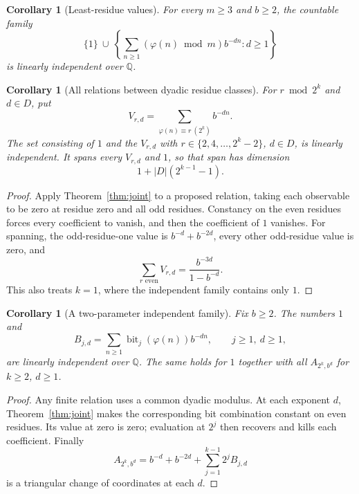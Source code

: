 \documentclass[11pt,a4paper]{article}
\newtheorem{corollary}[theorem]{Corollary}
\theoremstyle{definition}\newtheorem{definition}[theorem]{Definition}
\theoremstyle{remark}\newtheorem{remark}[theorem]{Remark}
\newcommand{\Q}{\mathbb Q}\newcommand{\R}{\mathbb R}\newcommand{\Z}{\mathbb Z}\newcommand{\N}{\mathbb N}
\newcommand{\ph}{\varphi}\newcommand{\rad}{\operatorname{rad}}
\begin{document}
\begin{corollary}[Least-residue values]\label{cor:jointleast}
For every $m\ge3$ and $b\ge2$, the countable family
\[
 \{1\}\ \cup\
 \left\{\sum_{n\ge1}(\ph(n)\bmod m)b^{-dn}:d\ge1\right\}
\]
is linearly independent over $\Q$.
\end{corollary}

\begin{corollary}[All relations between dyadic residue classes]\label{cor:value-dimension}
For $r\bmod2^k$ and $d\in D$, put
\[
 V_{r,d}=\sum_{\ph(n)\equiv r\ (2^k)}b^{-dn}.
\]
The set consisting of $1$ and the $V_{r,d}$ with
$r\in\{2,4,\ldots,2^k-2\}$, $d\in D$, is linearly independent.
It spans every $V_{r,d}$ and $1$, so that span has dimension
\[
 1+|D|(2^{k-1}-1).
\]
\end{corollary}
\begin{proof}
Apply Theorem~\ref{thm:joint} to a proposed relation, taking each observable
to be zero at residue zero and all odd residues. Constancy on the even
residues forces every coefficient to vanish, and then the coefficient of $1$
vanishes. For spanning, the odd-residue-one value is $b^{-d}+b^{-2d}$, every
other odd-residue value is zero, and
\[
 \sum_{r\text{ even}}V_{r,d}=\frac{b^{-3d}}{1-b^{-d}}.
\]
This also treats $k=1$, where the independent family contains only $1$.
\end{proof}

\begin{corollary}[A two-parameter independent family]\label{cor:grid}
Fix $b\ge2$. The numbers $1$ and
\[
 B_{j,d}=\sum_{n\ge1}\operatorname{bit}_j(\ph(n))b^{-dn},
 \qquad j\ge1,\ d\ge1,
\]
are linearly independent over $\Q$. The same holds for $1$ together with
all $A_{2^k,b^d}$ for $k\ge2$, $d\ge1$.
\end{corollary}
\begin{proof}
Any finite relation uses a common dyadic modulus. At each exponent $d$,
Theorem~\ref{thm:joint} makes the corresponding bit combination constant
on even residues. Its value at zero is zero; evaluation at $2^j$ then
recovers and kills each coefficient. Finally
\[
 A_{2^k,b^d}=b^{-d}+b^{-2d}+\sum_{j=1}^{k-1}2^jB_{j,d}
\]
is a triangular change of coordinates at each $d$.
\end{proof}
\end{document}
